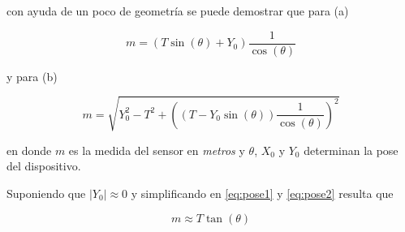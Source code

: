 \documentclass[10pt,conference,a4paper,onecolumn]{article}%
\begin{document}
con ayuda de un poco de geometría se puede demostrar que para (a) 

\begin{equation}
m= \left( T\sin(\theta) + Y_0 \right) \frac{1}{\cos(\theta)}
\label{eq:pose1}
\end{equation}

y para (b)

\begin{equation}
m=\sqrt{Y_0^2 - T^2 + \left((T-Y_0\sin(\theta))\frac{1}{\cos(\theta)} \right)^2}
\label{eq:pose2}
\end{equation}

en donde $m$ es la medida del sensor en \textit{metros} y $\theta$, $X_0$ y $Y_0$ determinan la pose del dispositivo. 

Suponiendo que $ | Y_0 | \approx 0$ y simplificando en \ref{eq:pose1} y \ref{eq:pose2}  resulta que

\begin{equation}
m \approx T \tan(\theta)
\end{equation} 


\end{document}
